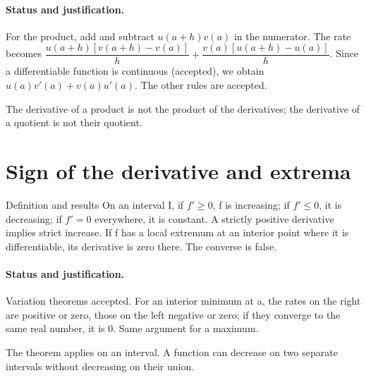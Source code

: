 \paragraph{Status and justification.} For the product, add and subtract $u(a+h)v(a)$ in the numerator. The rate becomes $\dfrac{u(a+h)[v(a+h)-v(a)]}{h}+\dfrac{v(a)[u(a+h)-u(a)]}{h}$. Since a differentiable function is continuous (accepted), we obtain $u(a)v\prime(a)+v(a)u\prime(a)$. The other rules are accepted.
\label{C06-EX2}
\begin{erreur}The derivative of a product is not the product of the derivatives; the derivative of a quotient is not their quotient.\end{erreur}
\label{C06-AP2}
\section{Sign of the derivative and extrema}\label{C06-U3}
\begin{repere}{Definition and results}
On an interval I, if $f\prime\geq0$, f is increasing; if $f\prime\leq0$, it is decreasing; if $f\prime=0$ everywhere, it is constant. A strictly positive derivative implies strict increase. If f has a local extremum at an interior point where it is differentiable, its derivative is zero there. The converse is false.
\end{repere}
\paragraph{Status and justification.} Variation theorems accepted. For an interior minimum at a, the rates on the right are positive or zero, those on the left negative or zero; if they converge to the same real number, it is 0. Same argument for a maximum.
\exemple{$f(x)=x^3-3x$: $f\prime(x)=3(x-1)(x+1)$. f increases on $]-\infty;-1]$, decreases on $[-1;1]$, increases on $[1;+\infty[$; local maximum $f(-1)=2$, local minimum $f(1)=-2$. Neither of these extrema is global on $\R$.}\label{C06-EX3}

\begin{erreur}The theorem applies on an interval. A function can decrease on two separate intervals without decreasing on their union.\end{erreur}
\label{C06-AP3}
